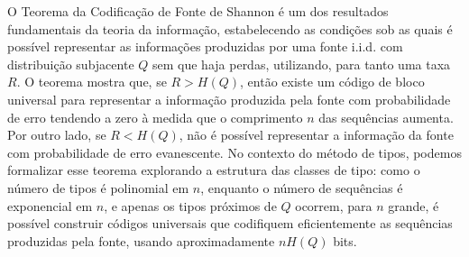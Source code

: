 O Teorema da Codificação de Fonte de Shannon é um dos resultados fundamentais da teoria
da informação, estabelecendo as condições sob as quais é possível representar
as informações produzidas por uma fonte i.i.d. com distribuição subjacente $Q$
sem que haja perdas, utilizando, para tanto uma taxa $R$.
O teorema mostra que, se $R > H(Q)$, então existe um código de bloco universal
para representar a informação produzida pela fonte com probabilidade de erro
tendendo a zero à medida que o comprimento $n$ das sequências aumenta.
Por outro lado, se $R < H(Q)$, não é possível representar a informação da fonte
com probabilidade de erro evanescente.
No contexto do método de tipos, podemos formalizar esse teorema explorando a
estrutura das classes de tipo: como o número de tipos é polinomial em $n$,
enquanto o número de sequências é exponencial em $n$, e apenas os tipos próximos
de $Q$ ocorrem, para $n$ grande, é possível construir códigos universais que
codifiquem eficientemente as sequências produzidas pela fonte, usando aproximadamente 
$nH(Q)$ bits.

